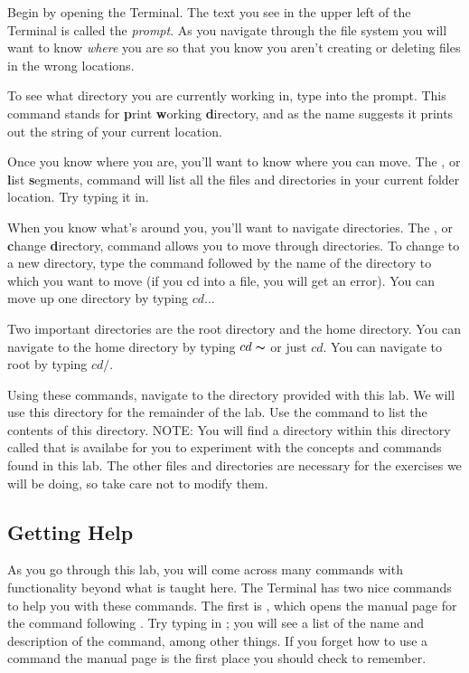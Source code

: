 Begin by opening the Terminal. The text you see in the upper left of the Terminal is called the \emph{prompt}.
As you navigate through the file system you will want to know \emph{where} you are so that you know you aren't creating or deleting files in the wrong locations.

To see what directory you are currently working in, type  into the prompt.
This command stands for \textbf{p}rint \textbf{w}orking \textbf{d}irectory, and as the name suggests it prints out the string of your current location.

Once you know where you are, you'll want to know where you can move.
The , or \textbf{l}ist \textbf{s}egments, command will list all the files and directories in your current folder location.
Try typing it in.

When you know what's around you, you'll want to navigate directories.
The , or \textbf{c}hange \textbf{d}irectory, command allows you to move through directories.
To change to a new directory, type the  command followed by the name of the directory to which you want to move (if you cd into a file, you will get an error).
You can move up one directory by typing $cd ..$.

Two important directories are the root directory and the home directory.
You can navigate to the home directory by typing $cd \thicksim$ or just $cd$.
You can navigate to root by typing $cd /$.

\begin{problem}
Using these commands, navigate to the  directory provided with this lab. We will use this directory for the remainder of the lab. Use the  command to list the contents of this directory. NOTE: You will find a directory within this directory called  that is availabe for you to experiment with the concepts and commands found in this lab. The other files and directories are necessary for the exercises we will be doing, so take care not to modify them.
\end{problem}

\subsection*{Getting Help}
As you go through this lab, you will come across many commands with functionality beyond what is taught here.
The Terminal has two nice commands to help you with these commands.
The first is , which opens the manual page for the command following .
Try typing in ; you will see a list of the name and description of the  command, among other things.
If you forget how to use a command the manual page is the first place you should check to remember.

